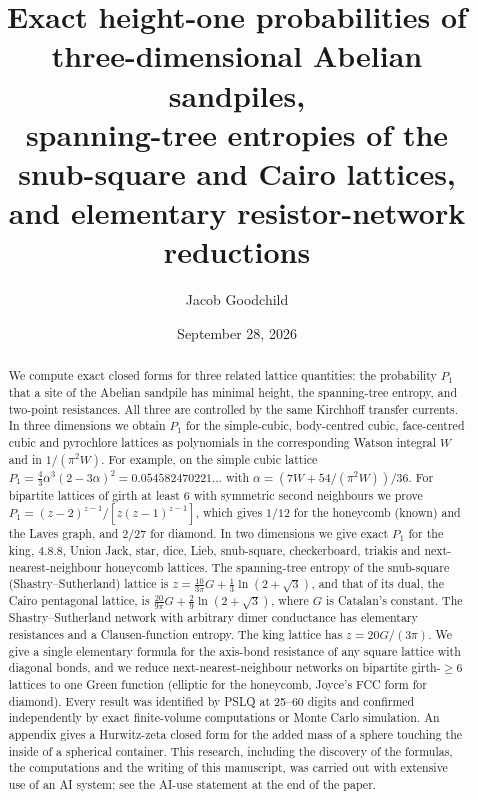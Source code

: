 \documentclass[aps,pre,10pt,twocolumn,superscriptaddress,nofootinbib]{revtex4-2}
\newcommand{\sq}{\sqrt{3}}
\begin{document}
\title{Exact height-one probabilities of three-dimensional Abelian sandpiles,\\
spanning-tree entropies of the snub-square and Cairo lattices,\\
and elementary resistor-network reductions}

\author{Jacob Goodchild}

\date{September 28, 2026}

\begin{abstract}
We compute exact closed forms for three related lattice quantities: the probability $P_1$
that a site of the Abelian sandpile has minimal height, the spanning-tree entropy, and
two-point resistances. All three are controlled by the same Kirchhoff transfer
currents. In three dimensions we obtain $P_1$ for the simple-cubic, body-centred cubic,
face-centred cubic and pyrochlore lattices as polynomials in the corresponding Watson
integral $W$ and in $1/(\pi^2 W)$. For example, on the simple cubic lattice
$P_1=\tfrac43\alpha^3(2-3\alpha)^2=0.054582470221\ldots$ with
$\alpha=(7W+54/(\pi^2W))/36$. For bipartite lattices of girth at least 6 with symmetric
second neighbours we prove $P_1=(z-2)^{z-1}/[z(z-1)^{z-1}]$, which gives $1/12$ for the
honeycomb (known) and the Laves graph, and $2/27$ for diamond. In two dimensions we give exact
$P_1$ for the king, 4.8.8, Union Jack, star, dice, Lieb, snub-square, checkerboard, triakis
and next-nearest-neighbour honeycomb lattices. The spanning-tree entropy of the snub-square
(Shastry--Sutherland) lattice is $z=\tfrac{10}{3\pi}G+\tfrac13\ln(2+\sq)$, and that of its dual,
the Cairo pentagonal lattice, is $\tfrac{20}{9\pi}G+\tfrac29\ln(2+\sq)$, where $G$ is Catalan's
constant. The Shastry--Sutherland network with arbitrary dimer conductance has elementary
resistances and a Clausen-function entropy. The king lattice has
$z=20G/(3\pi)$. We give a single elementary formula for the axis-bond resistance of any
square lattice with diagonal bonds, and we reduce next-nearest-neighbour networks on bipartite
girth-$\ge6$ lattices to one Green function (elliptic for the honeycomb, Joyce's FCC form for
diamond). Every result was identified by PSLQ at 25--60 digits and confirmed independently by
exact finite-volume computations or Monte Carlo simulation. An appendix gives a Hurwitz-zeta
closed form for the added mass of a sphere touching the inside of a spherical container.
This research, including the discovery of the formulas, the computations and the writing of
this manuscript, was carried out with extensive use of an AI system; see the AI-use statement
at the end of the paper.
\end{abstract}
\end{document}
